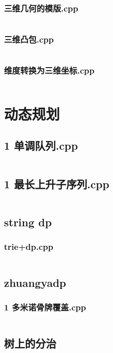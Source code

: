 \documentclass[a4paper,11pt]{article}
\begin{document}
\subsubsection{三维几何的模版.cpp}
\inputminted[breaklines]{c++}{"D:/tmplz/templates/几何/3D/三维几何的模版.cpp"}
\subsubsection{三维凸包.cpp}
\inputminted[breaklines]{c++}{"D:/tmplz/templates/几何/3D/三维凸包.cpp"}
\subsubsection{维度转换为三维坐标.cpp}
\inputminted[breaklines]{c++}{"D:/tmplz/templates/几何/3D/维度转换为三维坐标.cpp"}
\section{动态规划}
\subsection{1 单调队列.cpp}
\inputminted[breaklines]{c++}{"D:/tmplz/templates/动态规划/1 单调队列.cpp"}
\subsection{1 最长上升子序列.cpp}
\inputminted[breaklines]{c++}{"D:/tmplz/templates/动态规划/1 最长上升子序列.cpp"}
\subsection{string dp}
\subsubsection{trie+dp.cpp}
\inputminted[breaklines]{c++}{"D:/tmplz/templates/动态规划/string dp/trie+dp.cpp"}
\subsection{zhuangyadp}
\subsubsection{1 多米诺骨牌覆盖.cpp}
\inputminted[breaklines]{c++}{"D:/tmplz/templates/动态规划/zhuangyadp/1 多米诺骨牌覆盖.cpp"}
\subsection{树上的分治}
\end{document}
